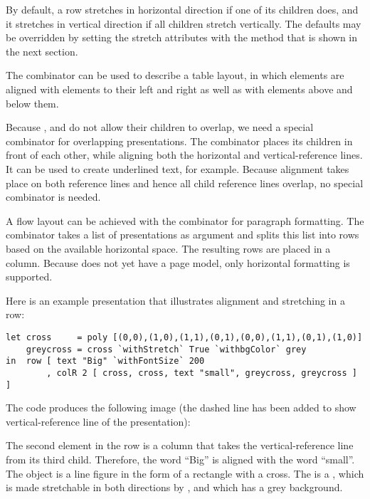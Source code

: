 By default, a row stretches in horizontal direction if one of its children does, and it stretches in vertical direction if all children stretch vertically. The defaults may be overridden by setting the stretch attributes with the method that is  shown in the next section. 

The  combinator can be used to describe a table layout, in which elements are aligned with elements to their left and right as well as with elements above and below them. 

Because ,  and  do not allow their children to overlap, we need a special combinator for overlapping presentations. The  combinator places its children in front of each other, while aligning both the horizontal and vertical-reference lines. It can be used to create underlined text, for example. Because alignment takes place on both reference lines and hence all child reference lines overlap, no special  combinator is needed.

A flow layout can be achieved with the  combinator for paragraph formatting. The combinator takes a list of presentations as argument and splits this list into rows based on the available horizontal space. The resulting rows are placed in a column.  Because  does not yet have a page model, only horizontal formatting is supported. 

Here is an example {\Xprez} presentation that illustrates alignment and stretching in a row:

\begin{small}
\begin{verbatim}
let cross     = poly [(0,0),(1,0),(1,1),(0,1),(0,0),(1,1),(0,1),(1,0)]
    greycross = cross `withStretch` True `withbgColor` grey
in  row [ text "Big" `withFontSize` 200
        , colR 2 [ cross, cross, text "small", greycross, greycross ] ] 
\end{verbatim}
\end{small}

The code produces the following image (the dashed line has been added to show vertical-reference line of the presentation):

\begin{center}
\end{center}

The second element in the row is a column that takes the vertical-reference line from its third child. Therefore, the word ``Big'' is aligned with the word ``small''. The  object is a line figure in the form of a rectangle with a cross. The  is a , which is made stretchable in both directions by , and which has a grey background.
 
